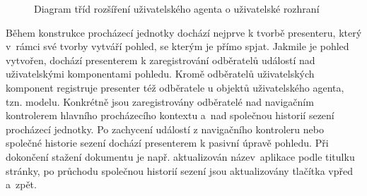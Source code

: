 \begin{figure}[H]
  \begin{center}
    \caption{Diagram tříd rozšíření uživatelského agenta o uživatelské rozhraní}
    \label{Figure.SimpleBrowserUiController}
  \end{center}
\end{figure}

\vspace{-1em}

Během konstrukce procházecí jednotky dochází nejprve k tvorbě presenteru, který v~rámci své tvorby vytváří pohled, se kterým je přímo spjat. Jakmile je pohled vytvořen, dochází presenterem k zaregistrování odběratelů událostí nad uživatelskými komponentami pohledu. Kromě odběratelů uživatelských komponent registruje presenter též odběratele u objektů uživatelského agenta, tzn. modelu. Konkrétně jsou zaregistrovány odběratelé nad navigačním kontrolerem hlavního procházecího kontextu a~nad společnou historií sezení procházecí jednotky. Po zachycení událostí z navigačního kontroleru nebo společné historie sezení dochází presenterem k pasivní úpravě pohledu. Při dokončení stažení dokumentu je např. aktualizován název~aplikace podle titulku stránky, po průchodu společnou historií sezení jsou aktualizovány tlačítka vpřed a~zpět.

